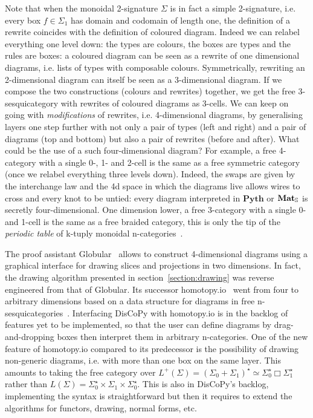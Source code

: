Note that when the monoidal 2-signature $\Sigma$ is in fact a simple 2-signature, i.e. every box $f \in \Sigma_1$ has domain and codomain of length one, the definition of a rewrite coincides with the definition of coloured diagram.
Indeed we can relabel everything one level down: the types are colours, the boxes are types and the rules are boxes: a coloured diagram can be seen as a rewrite of one dimensional diagrams, i.e. lists of types with composable colours.
Symmetrically, rewriting an 2-dimensional diagram can itself be seen as a 3-dimensional diagram.
If we compose the two constructions (colours and rewrites) together, we get the free 3-sesquicategory with rewrites of coloured diagrams as 3-cells.
We can keep on going with \emph{modifications} of rewrites, i.e. 4-dimensional diagrams, by generalising layers one step further with not only a pair of types (left and right) and a pair of diagrams (top and bottom) but also a pair of rewrites (before and after).
What could be the use of a such four-dimensional diagram?
For example, a free 4-category with a single 0-, 1- and 2-cell is the same as a free symmetric category (once we relabel everything three levels down).
Indeed, the swaps are given by the interchange law and the 4d space in which the diagrams live allows wires to cross and every knot to be untied: every diagram interpreted in $\mathbf{Pyth}$ or $\mathbf{Mat}_\S$ is secretly four-dimensional.
One dimension lower, a free 3-category with a single 0- and 1-cell is the same as a free braided category, this is only the tip of the \emph{periodic table} of k-tuply monoidal n-categories~\cite[Section~2.5]{BaezStay09}.

The proof assistant Globular~\cite{BarEtAl18} allows to construct 4-dimensional diagrams using a graphical interface for drawing slices and projections in two dimensions.
In fact, the drawing algorithm presented in section~\ref{section:drawing} was reverse engineered from that of Globular.
Its successor homotopy.io~\cite{ReutterVicary19} went from four to arbitrary dimensions based on a data structure for diagrams in free n-sesquicategories~\cite{BarVicary17}.
Interfacing DisCoPy with homotopy.io is in the backlog of features yet to be implemented, so that the user can define diagrams by drag-and-dropping boxes then interpret them in arbitrary n-categories.
One of the new feature of homotopy.io compared to its predecessor is the possibility of drawing non-generic diagrams, i.e. with more than one box on the same layer.
This amounts to taking the free category over $L^+(\Sigma) = (\Sigma_0 + \Sigma_1)^\star \simeq \Sigma_0^\star \Box \Sigma_1^\star$ rather than $L(\Sigma) = \Sigma_0^\star \times \Sigma_1 \times \Sigma_0^\star$.
This is also in DisCoPy's backlog, implementing the syntax is straightforward but then it requires to extend the algorithms for functors, drawing, normal forms, etc.

